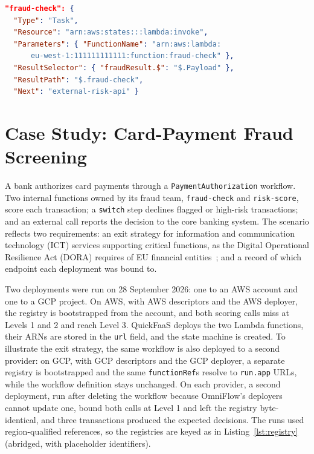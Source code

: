\documentclass[conference]{IEEEtran}
\begin{document}
\begin{lstlisting}[language=json,caption={Step Functions state rendered for an internal call.},label={lst:state}]
"fraud-check": {
  "Type": "Task",
  "Resource": "arn:aws:states:::lambda:invoke",
  "Parameters": { "FunctionName": "arn:aws:lambda:
      eu-west-1:111111111111:function:fraud-check" },
  "ResultSelector": { "fraudResult.$": "$.Payload" },
  "ResultPath": "$.fraud-check",
  "Next": "external-risk-api" }
\end{lstlisting}

\section{Case Study: Card-Payment Fraud Screening}
\label{sec:case}

A bank authorizes card payments through a \texttt{PaymentAuthorization} workflow. Two internal
functions owned by its fraud team, \texttt{fraud-check} and \texttt{risk-score}, score each
transaction; a \texttt{switch} step declines flagged or high-risk transactions; and an external
call reports the decision to the core banking system. The scenario reflects two requirements:
an exit strategy for information and communication technology (ICT) services supporting critical
functions, as the Digital Operational Resilience Act (DORA) requires of EU
financial entities~\cite{dora2022}; and a record of which endpoint each deployment was bound to.

Two deployments were run on 28 September 2026: one to an AWS account and one to a GCP project. On AWS, with AWS descriptors and the AWS deployer, the registry is bootstrapped from
the account, and both scoring calls miss at Levels 1 and 2 and reach Level 3. QuickFaaS deploys the
two Lambda functions, their ARNs are stored in the \texttt{url} field, and the state machine is
created. To illustrate the exit strategy, the same workflow is also deployed to a second provider:
on GCP, with GCP descriptors and the GCP deployer, a separate registry is bootstrapped and
the same \texttt{functionRef}s resolve to \texttt{run.app} URLs, while the workflow definition
stays unchanged. On each provider, a second deployment, run after deleting the workflow because
OmniFlow's deployers cannot update one, bound both calls at Level 1 and left the registry
byte-identical, and three transactions produced the expected decisions. The runs used
region-qualified references, so the registries are keyed as in Listing~\ref{lst:registry}
(abridged, with placeholder identifiers).
\end{document}
